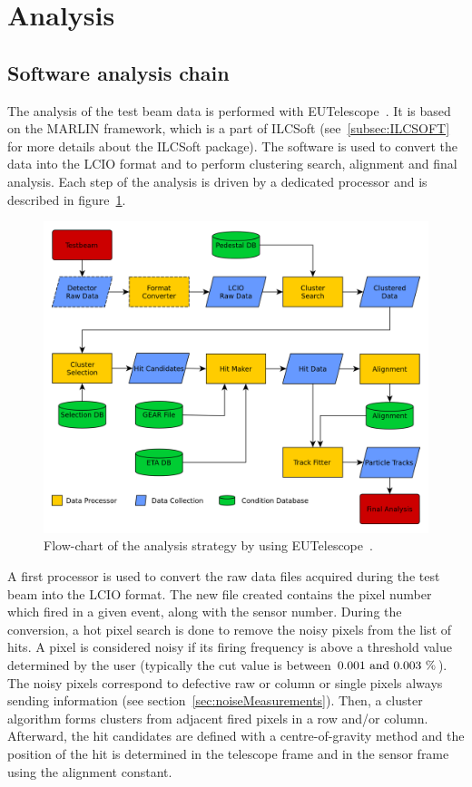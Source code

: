   \section{Analysis}
  \label{sec:X0}

   \subsection{Software analysis chain}

    The analysis of the test beam data is performed with EUTelescope~\cite{Eutel}\cite{Jansen}.
    It is based on the MARLIN framework, which is a part of ILCSoft (see~\ref{subsec:ILCSOFT} for more details about the ILCSoft package).
    The software is used to convert the data into the LCIO format and to perform clustering search, alignment and final analysis.
    Each step of the analysis is driven by a dedicated processor and is described in figure~\ref{fig:eutel-strategy}.
    
    \begin{figure}[!h]
      \centering
      \includegraphics[width = \textwidth]{Pictures/X0/eutel-strategy.png}
      \caption{Flow-chart of the analysis strategy by using EUTelescope~\cite{EUTelFlowChart}.}
      \label{fig:eutel-strategy}
    \end{figure}

    A first processor is used to convert the raw data files acquired during the test beam into the LCIO format.
    The new file created contains the pixel number which fired in a given event, along with the sensor number.
    During the conversion, a hot pixel search is done to remove the noisy pixels from the list of hits.
    A pixel is considered noisy if its firing frequency is above a threshold value determined by the user (typically the cut value is between $0.001~\rm{and}~0.003~\%$).
    The noisy pixels correspond to defective raw or column or single pixels always sending information (see section~\ref{sec:noiseMeasurements}).
    Then, a cluster algorithm forms clusters from adjacent fired pixels in a row and/or column.
    Afterward, the hit candidates are defined with a centre-of-gravity method and the position of the hit is determined in the telescope frame and in the sensor frame using the alignment constant.

